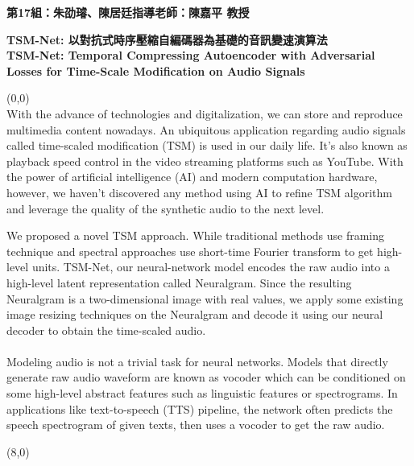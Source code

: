 \documentclass{article}
\begin{document}
\thispagestyle{empty}
\membersize \textbf{第17組：朱劭璿、陳居廷}\hspace{20.5cm}\textbf{指導老師：陳嘉平 教授}
\bigskip

\titlesize \textbf{TSM-Net: 以對抗式時序壓縮自編碼器為基礎的音訊變速演算法 \\
TSM-Net: Temporal Compressing Autoencoder with Adversarial Losses for Time-Scale Modification on Audio Signals}

\begin{textblock}{7.0}(0,0)
 \\
\Large
With the advance of technologies and digitalization, we can store and reproduce multimedia content nowadays. An ubiquitous application regarding audio signals called time-scaled modification (TSM) is used in our daily life. It's also known as playback speed control in the video streaming platforms such as YouTube. With the power of artificial intelligence (AI) and modern computation hardware, however, we haven't discovered any method using AI to refine TSM algorithm and leverage the quality of the synthetic audio to the next level.

We proposed a novel TSM approach. While traditional methods use framing technique and spectral approaches use short-time Fourier transform to get high-level units. TSM-Net, our neural-network model encodes the raw audio into a high-level latent representation called Neuralgram. Since the resulting Neuralgram is a two-dimensional image with real values, we apply some existing image resizing techniques on the Neuralgram and decode it using our neural decoder to obtain the time-scaled audio. \\

\medskip
{} \\
\Large
 Modeling audio is not a trivial task for neural networks. Models that directly generate raw audio waveform are known as vocoder which can be conditioned on some high-level abstract features such as linguistic features or spectrograms. In applications like text-to-speech (TTS) pipeline, the network often predicts the speech spectrogram of given texts, then uses a vocoder to get the raw audio.

\large 
\end{textblock}

\begin{textblock}{7.0}(8,0)
 \\
\Large \lipsum[3-3]
\large 

\medskip

 \\
\Large \lipsum[4-4]

\medskip
{} \\
\Large \lipsum[5-5]
\end{textblock}
\end{document}

